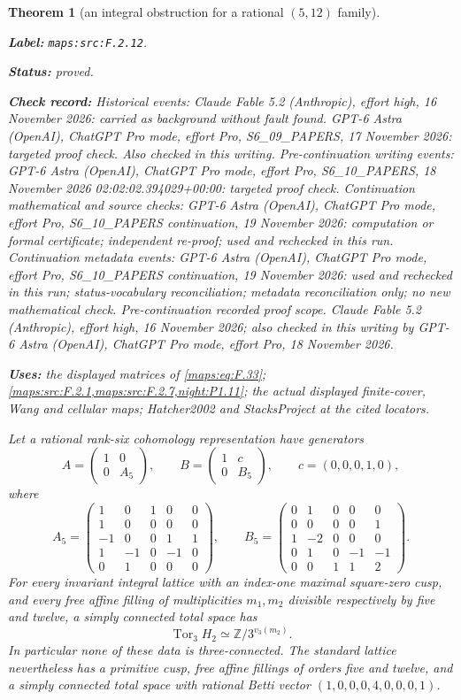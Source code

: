 \documentclass[11pt,a4paper]{article}
\newtheorem{theorem}{Theorem}[section]
\theoremstyle{definition}
\newcommand{\StatementRecord}[4]{\par\smallskip\begingroup\upshape\raggedright\noindent\textbf{Label:} \nolinkurl{#1}.\par\noindent\textbf{Status:} #2.\par\noindent\textbf{Check record:} #3.\par\noindent\textbf{Uses:} #4.\par\endgroup\smallskip}
\begin{document}
\begin{theorem}[an integral obstruction for a rational $(5,12)$ family]\label{maps:src:F.2.12}
\StatementRecord{maps:src:F.2.12}{proved}{Historical events: Claude Fable 5.2 (Anthropic), effort high, 16 November 2026: carried as background without fault found. GPT-6 Astra (OpenAI), ChatGPT Pro mode, effort Pro, S6\_09\_PAPERS, 17 November 2026: targeted proof check. Also checked in this writing. Pre-continuation writing events: GPT-6 Astra (OpenAI), ChatGPT Pro mode, effort Pro, S6\_10\_PAPERS, 18 November 2026 02:02:02.394029+00:00: targeted proof check. Continuation mathematical and source checks: GPT-6 Astra (OpenAI), ChatGPT Pro mode, effort Pro, S6\_10\_PAPERS continuation, 19 November 2026: computation or formal certificate; independent re-proof; used and rechecked in this run. Continuation metadata events: GPT-6 Astra (OpenAI), ChatGPT Pro mode, effort Pro, S6\_10\_PAPERS continuation, 19 November 2026: used and rechecked in this run; status-vocabulary reconciliation; metadata reconciliation only; no new mathematical check. \emph{Pre-continuation recorded proof scope.} Claude Fable 5.2 (Anthropic), effort high, 16 November 2026; also checked in this writing by GPT-6 Astra (OpenAI), ChatGPT Pro mode, effort Pro, 18 November 2026}{the displayed matrices of \eqref{maps:eq:F.33}; \cref{maps:src:F.2.1,maps:src:F.2.7,night:P1.11}; the actual displayed finite-cover, Wang and cellular maps; Hatcher2002 and StacksProject at the cited locators}


Let a rational rank-six cohomology representation have generators
\[
 A=\begin{pmatrix}1&0\\0&A_5\end{pmatrix},\qquad
 B=\begin{pmatrix}1&c\\0&B_5\end{pmatrix},\qquad
 c=(0,0,0,1,0),
\]
where
\[
 A_5=\begin{pmatrix}
 1&0&1&0&0\\1&0&0&0&0\\-1&0&0&1&1\\
 1&-1&0&-1&0\\0&1&0&0&0
 \end{pmatrix},\qquad
 B_5=\begin{pmatrix}
 0&1&0&0&0\\0&0&0&0&1\\1&-2&0&0&0\\
 0&1&0&-1&-1\\0&0&1&1&2
 \end{pmatrix}.
 \tag{F.33}\label{maps:eq:F.33}
\]
For every invariant integral lattice with an index-one maximal
square-zero cusp, and every free affine filling of multiplicities
$m_1,m_2$ divisible respectively by five and twelve, a simply
connected total space has
\[
 \operatorname{Tor}_3 H_2
       \simeq\mathbb Z/3^{v_3(m_2)}.
 \tag{F.34}\label{maps:eq:F.34}
\]
In particular none of these data is three-connected.
The standard lattice nevertheless has a primitive cusp,
free affine fillings of orders five and twelve, and a simply
connected total space with rational Betti vector
$(1,0,0,0,4,0,0,0,1)$.

\end{theorem}
\end{document}
